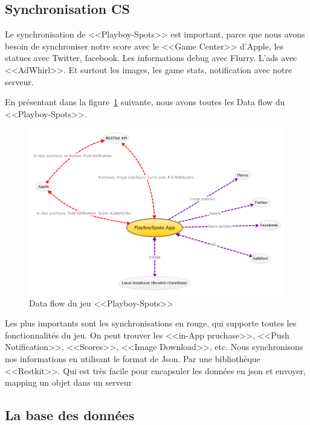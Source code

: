 

\subsection{Synchronisation CS} %

Le synchronisation de <<Playboy-Spots>> est important, parce que nous avons besoin de synchroniser notre score avec le <<Game Center>> d'Apple, les statues avec Twitter, facebook. Les informations debug avec Flurry. L'ads avec <<AdWhirl>>. Et surtout les images, les game stats, notification avec notre serveur.

En présentant dans la figure~\ref{fig:XMinds_DataFlow} suivante, nous avons toutes les Data flow du <<Playboy-Spots>>.

\begin{figure}[htbp]
	\centering
		\includegraphics[width=7in]{XMinds/DataFlow.png}
	\caption{Data flow du jeu <<Playboy-Spots>>}
	\label{fig:XMinds_DataFlow}
\end{figure}

Les plus importants sont les synchronisations en rouge, qui supporte toutes les fonctionnalités du jeu. On peut trouver les <<in-App pruchase>>, <<Push Notification>>, <<Scores>>, <<Image Download>>, etc.
Nous synchronisons nos informations en utilisant le format de Json. Par une bibliothèque <<Restkit>>. Qui est très facile pour encapsuler les données en json et envoyer, mapping un objet dans un serveur  


\subsection{La base des données} %


